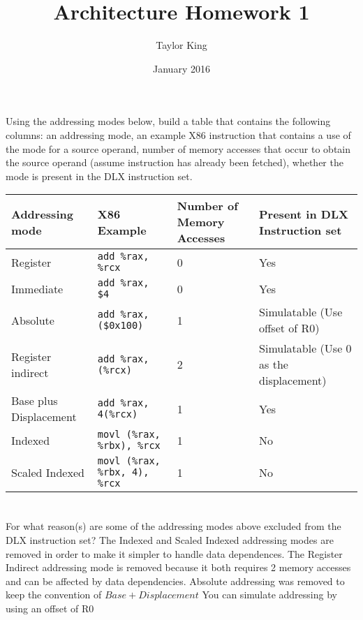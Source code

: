 \documentclass{article}
\title{Architecture Homework 1}
\author{Taylor King }
\date{January 2016}
\begin{document}
\maketitle

\section{}
Using the addressing modes below, build a table that contains the following columns: an addressing mode, an example X86 instruction that contains a use of the mode for a source operand, number of memory accesses that occur to obtain the source operand (assume instruction has already been fetched), whether the mode is present in the DLX instruction set.
\vspace{5mm}


\begin{tabular}{|p{3cm}|p{3cm}|p{3cm}|p{3cm}|}
    \hline
    Addressing mode & X86 Example & Number of Memory Accesses & Present in DLX Instruction set \\
    \hline
    Register & \texttt{add \%rax, \%rcx} & 0 & Yes \\
    Immediate & \texttt{add \%rax, \$4} & 0 & Yes \\
    Absolute & \texttt{add \%rax, (\$0x100)} & 1 & Simulatable (Use offset of R0) \\
    Register indirect & \texttt{add \%rax, (\%rcx)} & 2 & Simulatable (Use 0 as the displacement) \\ 
    Base plus Displacement & \texttt{add \%rax, 4(\%rcx)} & 1 & Yes\\ 
    Indexed & \texttt{movl (\%rax, \%rbx), \%rcx} & 1 & No \\ 
    Scaled Indexed & \texttt{movl (\%rax, \%rbx, 4), \%rcx} & 1 & No \\
    \hline
\end{tabular}
\vspace{5mm}
\section{} 
For what reason(s) are some of the addressing modes above excluded from the DLX instruction set?
\vspace{10mm}
The Indexed and Scaled Indexed addressing modes are removed in order to make it simpler to handle data dependences. The Register Indirect addressing mode is removed because it both requires 2 memory accesses and can be affected by data dependencies. Absolute addressing was removed to keep the convention of $Base + Displacement$ You can simulate addressing by using an offset of R0
\end{document}
